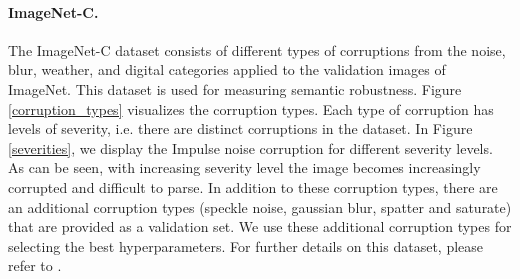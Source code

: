 \documentclass{article}
\begin{document}
\paragraph{ImageNet-C.} 
The ImageNet-C dataset \citep{hendrycks2019robustness} consists of  different types of corruptions
from the noise, blur, weather, and digital categories applied to the validation images of ImageNet.
This dataset is used for measuring semantic robustness.
Figure \ref{corruption_types} visualizes the corruption types.
Each type of corruption has  levels of severity, i.e. there are  distinct corruptions in the dataset.
In Figure \ref{severities}, we display the Impulse noise corruption for  different severity levels. 
As can be seen, with increasing severity level the image becomes increasingly corrupted and difficult to parse.
In addition to these  corruption types, there are an additional  corruption types (speckle noise, gaussian blur, spatter and saturate) that are provided as a validation set.
We use these additional corruption types for selecting the best hyperparameters.
For further details on this dataset, please refer to \citep{hendrycks2019robustness}.
\end{document}
